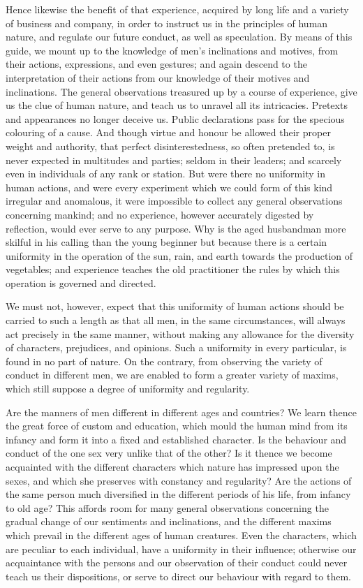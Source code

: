 \documentclass[]{article}
\begin{document}
\begin{sectionbody}
\humeparagraph  Hence likewise the benefit of that experience, acquired by long life and a variety of business and company, in order to instruct us in the principles of human nature, and regulate our future conduct, as well as speculation. By means of this guide, we mount up to the knowledge of men's inclinations and motives, from their actions, expressions, and even gestures; and again descend to the interpretation of their actions from our knowledge of their motives and inclinations. The general observations treasured up by a course of experience, give us the clue of human nature, and teach us to unravel all its intricacies. Pretexts and appearances no longer deceive us. Public declarations pass for the specious colouring of a cause. And though virtue and honour be allowed their proper weight and authority, that perfect disinterestedness, so often pretended to, is never expected in multitudes and parties; seldom in their leaders; and scarcely even in individuals of any rank or station. But were there no uniformity in human actions, and were every experiment which we could form of this kind irregular and anomalous, it were impossible to collect any general observations concerning mankind; and no experience, however accurately digested by reflection, would ever serve to any purpose. Why is the aged husbandman more skilful in his calling than the young beginner but because there is a certain uniformity in the operation of the sun, rain, and earth towards the production of vegetables; and experience teaches the old practitioner the rules by which this operation is governed and directed.

\humeparagraph  We must not, however, expect that this uniformity of human actions should be carried to such a length as that all men, in the same circumstances, will always act precisely in the same manner, without making any allowance for the diversity of characters, prejudices, and opinions. Such a uniformity in every particular, is found in no part of nature. On the contrary, from observing the variety of conduct in different men, we are enabled to form a greater variety of maxims, which still suppose a degree of uniformity and regularity.

\humeparagraph  Are the manners of men different in different ages and countries? We learn thence the great force of custom and education, which mould the human mind from its infancy and form it into a fixed and established character. Is the behaviour and conduct of the one sex very unlike that of the other? Is it thence we become acquainted with the different characters which nature has impressed upon the sexes, and which she preserves with constancy and regularity? Are the actions of the same person much diversified in the different periods of his life, from infancy to old age? This affords room for many general observations concerning the gradual change of our sentiments and inclinations, and the different maxims which prevail in the different ages of human creatures. Even the characters, which are peculiar to each individual, have a uniformity in their influence; otherwise our acquaintance with the persons and our observation of their conduct could never teach us their dispositions, or serve to direct our behaviour with regard to them.


\end{sectionbody}
\end{document}
